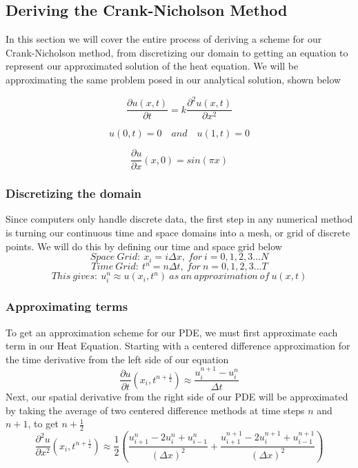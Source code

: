 \documentclass[12pt, reqno]{amsart}
\begin{document}
\subsection{Deriving the Crank-Nicholson Method}
In this section we will cover the entire process of deriving a scheme for our Crank-Nicholson method, from discretizing our domain to getting an equation to represent our approximated solution of the heat equation. We will be approximating the same problem posed in our analytical solution, shown below

\begin{equation*}\frac{\partial{u}(x,t)}{\partial{t}} = k\frac{\partial^2u(x,t)}{\partial{x^2}}
\end{equation*}

\begin{equation*} 
u(0,t) = 0\quad and \quad u(1,t) = 0
\end{equation*}

\begin{equation*}
\frac{\partial{u}}{\partial{x}}(x,0) = sin(\pi x)
\end{equation*}

\subsubsection{Discretizing the domain}
Since computers only handle discrete data, the first step in any numerical method is turning our continuous time and space domains into a mesh, or grid of discrete points. We will do this by defining our time and space grid below
\[
Space\:Grid:\:x_i = i\Delta x , \:for\ i = 0,1,2,3...N
\]
\[
Time\:Grid: \: t^n = n\Delta t,\: for \: n = 0,1,2,3...T
\]
\[
This \:gives:\: u_i^n \approx u(x_i,t^n) \: as \: an \: approximation \: of\: u(x,t)
\]
\subsubsection{Approximating terms}
To get an approximation scheme for our PDE, we must first approximate each term in our Heat Equation. Starting with a centered difference approximation for the time derivative from the left side of our equation
\begin{equation}
\frac{\partial u}{\partial t}(x_i, t^{n+\frac{1}{2}}) \approx \frac{u_i^{n+1} - u_i^n}{\Delta t}
\end{equation}
Next, our spatial derivative from the right side of our PDE will be approximated by taking the average of two centered difference methods at time steps $n$ and $n + 1$, to get $n + \frac{1}{2 }$
\begin{equation}
\frac{\partial^2 u}{\partial x^2}(x_i, t^{n + \frac{1}{2}}) \approx \frac{1}{2} \left( \frac{u_{i+1}^n - 2u_i^n + u_{i - 1}^{n}}{(\Delta x)^2} + \frac{u_{i+1}^{n + 1} -2u_i^{n + 1} + u_{i - 1}^{n + 1}}{(\Delta x)^2}         \right)
\end{equation}
\end{document}
